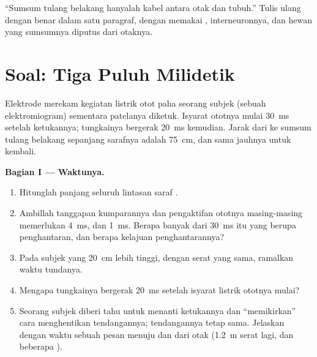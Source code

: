\begin{exercise}[$\star\star\star$]\label{exo:g12:stretch-reflex:15}
``Sumsum tulang belakang hanyalah kabel antara otak dan tubuh.'' Tulis
ulang dengan benar dalam satu paragraf, dengan memakai ,
interneuronnya, dan hewan yang sumsumnya diputus dari otaknya.
\end{exercise}

\section{Soal: Tiga Puluh Milidetik}

\begin{problem}
\label{pb:g12:stretch-reflex:1}
Elektrode merekam kegiatan listrik otot paha seorang subjek (sebuah
elektromiogram) sementara  patelanya diketuk. Isyarat ototnya
mulai \qty{30}{ms} setelah ketukannya; tungkainya bergerak \qty{20}{ms}
kemudian. Jarak dari  ke sumsum tulang belakang sepanjang
sarafnya adalah \qty{75}{cm}, dan sama jauhnya untuk kembali.

\medskip
\noindent\textbf{Bagian I --- Waktunya.}
\begin{enumerate}
  \item Hitunglah panjang seluruh lintasan saraf .
  \item Ambillah tanggapan kumparannya dan pengaktifan ototnya
        masing-masing memerlukan \qty{4}{ms}, dan 
        \qty{1}{ms}. Berapa banyak dari \qty{30}{ms} itu yang berupa
        penghantaran, dan berapa kelajuan penghantarannya?
  \item Pada subjek yang \qty{20}{cm} lebih tinggi, dengan serat yang
        sama, ramalkan waktu tundanya.
  \item Mengapa tungkainya bergerak \qty{20}{ms} setelah isyarat
        listrik ototnya mulai?
  \item Seorang subjek diberi tahu untuk menanti ketukannya dan
        ``memikirkan'' cara menghentikan tendangannya; tendangannya
        tetap sama. Jelaskan dengan waktu sebuah pesan menuju dan dari
        otak (\qty{1.2}{m} serat lagi, dan beberapa ).
\end{enumerate}


\end{problem}
